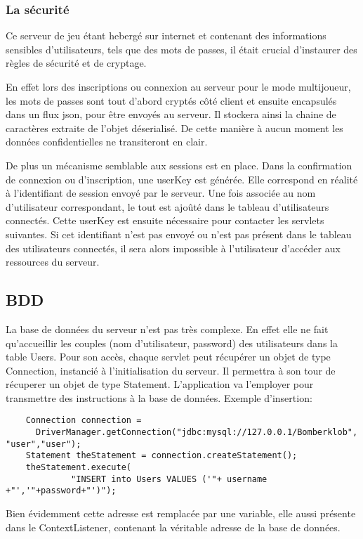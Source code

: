 		
	\subsubsection{La sécurité}
	
		Ce serveur de jeu étant hebergé sur internet et contenant des informations
		sensibles d'utilisateurs, tels que des mots de passes, il était crucial
		d'instaurer des règles de sécurité et de cryptage. 
		
		En effet lors des inscriptions ou connexion au serveur pour le mode
		multijoueur, les mots de passes sont tout d'abord cryptés côté client et
		ensuite encapsulés dans un flux \gls{json}, pour être envoyés au serveur. Il
		stockera ainsi la chaine de caractères extraite de l'objet déserialisé. De cette
		manière à aucun moment les données confidentielles ne transiteront en clair.
		
		De plus un mécanisme semblable aux sessions est en place. Dans la
		confirmation de connexion ou d'inscription, une userKey est générée. Elle correspond en
		réalité à l'identifiant de session envoyé par le serveur. Une fois associée
		au nom d'utilisateur correspondant, le tout est ajoûté dans le tableau
		d'utilisateurs connectés.
		Cette userKey est ensuite nécessaire pour contacter les \glspl{servlet}
		suivantes. Si cet identifiant n'est pas envoyé ou n'est pas présent dans le tableau des
		utilisateurs connectés, il sera alors impossible à l'utilisateur d'accéder aux
		ressources du serveur.
		
\subsection{BDD}

	La base de données du serveur n'est pas très complexe. En effet elle ne fait
	qu'accueillir les couples (nom d'utilisateur, password) des utilisateurs dans
	la table Users. 
	Pour son accès, chaque \gls{servlet} peut récupérer un objet de type
	Connection, instancié à l'initialisation du serveur. Il permettra à son tour
	de récuperer un objet de type Statement. L'application va l'employer pour
	transmettre des instructions à la base de données.
	Exemple d'insertion: 
		
	\begin{verbatim}
	Connection connection = 
	  DriverManager.getConnection("jdbc:mysql://127.0.0.1/Bomberklob", "user","user");
	Statement theStatement = connection.createStatement();
	theStatement.execute(
		     "INSERT into Users VALUES ('"+ username +"','"+password+"')");
	\end{verbatim}
	
	Bien évidemment cette adresse est remplacée par une variable, elle aussi
	présente dans le ContextListener, contenant la véritable adresse de la base de
	données.
	
	
	
	